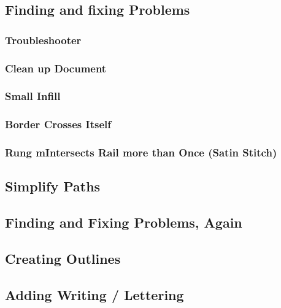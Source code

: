 \documentclass{article}
\begin{document}
        \subsection{Finding and fixing Problems}

            \subsubsection{Troubleshooter}

            \subsubsection{Clean up Document}

            \subsubsection{Small Infill}

            \subsubsection{Border Crosses Itself}

            \subsubsection{Rung mIntersects Rail more than Once (Satin Stitch)}

        \subsection{Simplify Paths}

        \subsection{Finding and Fixing Problems, Again}

        \subsection{Creating Outlines}

        \subsection{Adding Writing / Lettering}
\end{document}
